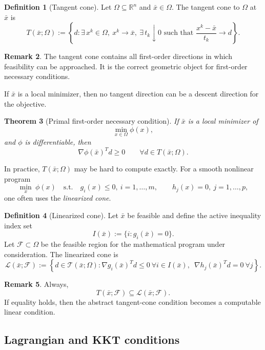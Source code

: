 \documentclass[pdflatex,sn-mathphys-num]{sn-jnl}%
\newtheorem{theorem}{Theorem}[section]
\theoremstyle{definition}
\newtheorem{definition}[theorem]{Definition}
\newtheorem{remark}[theorem]{Remark}
\begin{document}
\begin{definition}[Tangent cone]
Let $\Omega\subseteq\mathbb{R}^n$ and $\bar x\in\Omega$. The tangent cone to
$\Omega$ at $\bar x$ is
\[
T(\bar x;\Omega)
:=
\left\{
d:
\exists\, x^k\in \Omega,\ x^k\to \bar x,\ \exists\, t_k\downarrow 0
\text{ such that }
\frac{x^k-\bar x}{t_k}\to d
\right\}.
\]
\end{definition}

\begin{remark}
The tangent cone contains all first-order directions in which feasibility can
be approached. It is the correct geometric object for first-order necessary
conditions.
\end{remark}

If $\bar x$ is a local minimizer, then no tangent direction can be a descent
direction for the objective.

\begin{theorem}[Primal first-order necessary condition]
If $\bar x$ is a local minimizer of
\[
\min_{x\in\Omega}\phi(x),
\]
and $\phi$ is differentiable, then
\[
\nabla \phi(\bar x)^T d \ge 0
\qquad \forall d\in T(\bar x;\Omega).
\]
\end{theorem}

In practice, $T(\bar x;\Omega)$ may be hard to compute exactly. For a smooth
nonlinear program
\[
\min_x \ \phi(x)
\quad
\text{s.t.}\quad
g_i(x)\le 0,\ i=1,\dots,m,\qquad
h_j(x)=0,\ j=1,\dots,p,
\]
one often uses the \emph{linearized cone}.

\begin{definition}[Linearized cone]
Let $\bar x$ be feasible and define the active inequality index set
\[
I(\bar x):=\{i:g_i(\bar x)=0\}.
\]
Let $\mathcal{F}\subset \Omega$ be the feasible region for the mathematical program under consideration.
The linearized cone is
\[
\mathcal{L}(\bar x; \mathcal{F})
:=
\left\{
d\in \mathcal{T}(\bar{x};\Omega):
\nabla g_i(\bar x)^T d\le 0 \ \forall i\in I(\bar x),\,\,\,
\nabla h_j(\bar x)^T d=0 \ \forall j
\right\}.
\]
\end{definition}

\begin{remark}
Always,
\[
T(\bar x;\mathcal{F})\subseteq \mathcal{L}(\bar x;\mathcal{F}).
\]
If equality holds, then the abstract tangent-cone condition becomes a
computable linear condition.
\end{remark}

\subsection{Lagrangian and KKT conditions}
\end{document}
